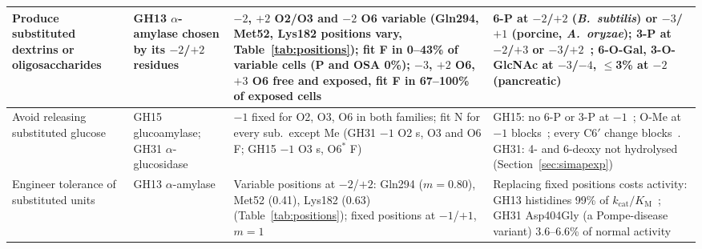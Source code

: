 \documentclass[preprint,12pt]{elsarticle}
\begin{document}
\begin{table}
\begin{tabular}{p{2.6cm}p{3.4cm}p{6.2cm}p{6.2cm}}
\midrule
Produce substituted dextrins or oligosaccharides &
GH13 $\alpha$-amylase chosen by its $-2$/$+2$ residues &
$-2$, $+2$ O2/O3 and $-2$ O6 variable (Gln294, Met52, Lys182 positions vary, Table~\ref{tab:positions}); fit F in
0--43\% of variable cells (P and OSA 0\%); $-3$, $+2$ O6, $+3$ O6 free and exposed, fit F in 67--100\% of exposed cells &
6-P at $-2$/$+2$ (\emph{B.~subtilis}) or $-3$/$+1$ (porcine, \emph{A.~oryzae}); 3-P at $-2$/$+3$ or
$-3$/$+2$~\citep{Takeda1983,TakedaHizukuri1986,Takeda1987}; 6-O-Gal, 3-O-GlcNAc at $-3$/$-4$, $\le$3\% at
$-2$ (pancreatic)~\citep{Okada2000} \\
\midrule
Avoid releasing substituted glucose &
GH15 glucoamylase; GH31 $\alpha$-glucosidase &
$-1$ fixed for O2, O3, O6 in both families; fit N for every sub.\ except Me (GH31 $-1$ O2 s, O3 and O6 F; GH15
$-1$ O3 s, O6$^\ast$ F) &
GH15: no 6-P or 3-P at $-1$~\citep{Takeda1987}; O-Me at $-1$ blocks~\citep{Lemieux1996}; every C6$'$
change blocks~\citep{Bock1988}. GH31: 4- and 6-deoxy not hydrolysed (Section~\ref{sec:simapexp}) \\
\midrule
Engineer tolerance of substituted units &
GH13 $\alpha$-amylase &
Variable positions at $-2$/$+2$: Gln294 ($m = 0.80$), Met52 (0.41), Lys182 (0.63) (Table~\ref{tab:positions});
fixed positions at $-1$/$+1$, $m = 1$ &
Replacing fixed positions costs activity: GH13 histidines 99\% of
$k_\mathrm{cat}/K_\mathrm{M}$~\citep{Sogaard1993}; GH31 Asp404Gly (a Pompe-disease variant) 3.6--6.6\% of normal activity~\citep{Nilsson2014} \\
\bottomrule
\end{tabular}
\end{table}


\clearpage
\end{document}
